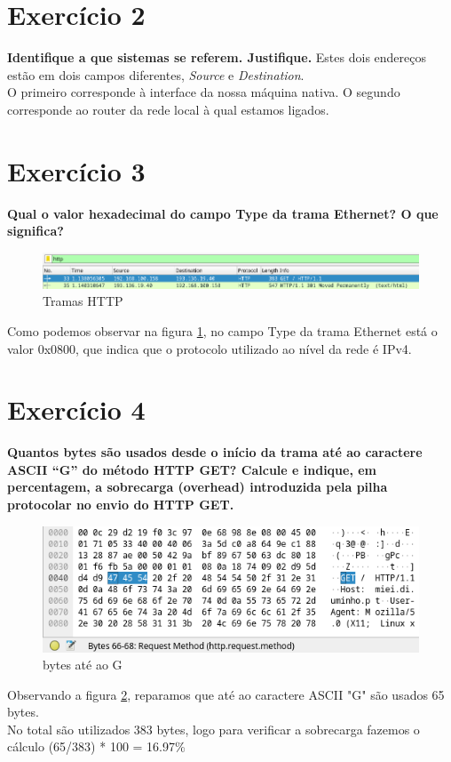 \documentclass[a4paper]{report}
\begin{document}
\section{Exercício 2}
\textbf{Identifique a que sistemas se referem. Justifique.}
Estes dois endereços estão em dois campos diferentes, \textit{Source} e
\textit{Destination}.\\
O primeiro corresponde à interface da nossa máquina nativa. O segundo
corresponde ao router da rede local à qual estamos ligados.

\section{Exercício 3}
\textbf{Qual o valor hexadecimal do campo Type da trama Ethernet? O que
significa?}

\begin{figure}[H]
    \centering 
    \includegraphics[width=\textwidth]{images/tramasHttp.png}  
    \caption{Tramas HTTP}
    \label{fig:tramasHttp}
\end{figure}
Como podemos observar na figura \ref{fig:tramasHttp}, no campo Type da trama
Ethernet está o valor 0x0800, que indica que o protocolo utilizado ao nível da
rede é IPv4.

\section{Exercício 4}
\textbf{Quantos bytes são usados desde o início da trama até ao caractere ASCII
“G” do método HTTP GET? Calcule e indique, em percentagem, a sobrecarga
(overhead) introduzida pela pilha protocolar no envio do HTTP GET.}

\begin{figure}[H]
    \centering 
    \includegraphics[width=\textwidth]{images/bytes2G.png}
    \caption{bytes até ao G}
    \label{fig:bytes2G}
\end{figure}
Observando a figura \ref{fig:bytes2G}, reparamos que até ao caractere ASCII "G"
são usados 65 bytes.\\
No total são utilizados 383 bytes, logo para verificar a sobrecarga fazemos o
cálculo (65/383) * 100 = 16.97\%
\end{document}
